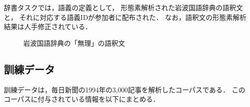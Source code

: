辞書タスクでは，語義の定義として，
形態素解析された岩波国語辞典の語釈文と，
それに対応する語義IDが参加者に配布された．
なお，語釈文の形態素解析結果は人手修正されている．

\begin{figure}[btp]

  \begin{center}
  \noindent
  \end{center}
  
  \caption{岩波国語辞典の「無理」の語釈文}
  \label{fig:dic-MURI}
  \bigskip
\end{figure}

\subsection{訓練データ}
\label{sec:train data}

訓練データは，毎日新聞の1994年の3,000記事を解析したコーパスである．
このコーパスに付与されている情報を以下にまとめる．


